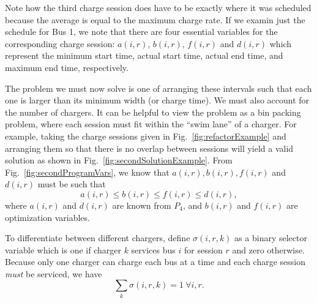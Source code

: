 \par Note how the third charge session does have to be exactly where it was scheduled because the average is equal to the maximum charge rate.
If we examin just the schedule for Bus 1, we note that there are four essential variables for the corresponding charge session: $a(i,r)$, $b(i,r)$, $f(i,r)$ and $d(i,r)$ which represent the minimum start time, actual start time, actual end time, and maximum end time, respectively. 
\par The problem we must now solve is one of arranging these intervals such that each one is larger than its minimum width (or charge time).  We must also account for the number of chargers. It can be helpful to view the problem as a bin packing problem, where each session must fit within the ``swim lane'' of a charger.  For example, taking the charge sessions given in Fig.~\ref{fig:refactorExample} and arranging them so that there is no overlap between sessions will yield a valid solution as shown in Fig.~\ref{fig:secondSolutionExample}.
From Fig.~\ref{fig:secondProgramVars}, we know that $a(i,r), b(i,r),f(i,r)$ and $d(i,r)$ must be such that
\begin{equation}\label{eqn:assignment:eqn1}
	a(i,r) \leq b(i,r) \leq f(i,r) \leq d(i,r),
\end{equation}
where $a(i,r)$ and $d(i,r)$ are known from $P_4$, and $b(i,r)$ and $f(i,r)$ are optimization variables.

\par To differentiate between different chargers, define $\sigma(i,r,k)$ as a binary selector variable which is one if charger $k$ services bus $i$ for session $r$ and zero otherwise. Because only one charger can charge each bus at a time and each charge session {\it must} be serviced, we have
\begin{equation}\label{eqn:assignment:eqn2}
	\sum_k \sigma(i,r,k) = 1  \ \forall i,r.
\end{equation}

